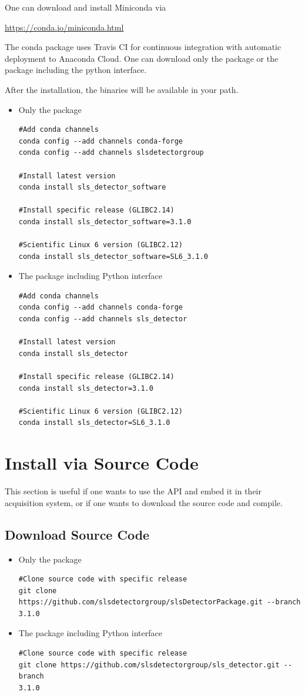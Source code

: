 \documentclass{article}
\begin{document}
\noindent One can download and install Miniconda via 

\url{https://conda.io/miniconda.html} \bigskip

\noindent The conda package uses Travis CI for continuous integration with
automatic deployment to Anaconda Cloud. One can download only the package or the
package including the python interface. \bigskip

\noindent After the installation, the binaries will be available in your path.


\begin{itemize}
 \item Only the package
\begin{verbatim}
#Add conda channels
conda config --add channels conda-forge
conda config --add channels slsdetectorgroup

#Install latest version
conda install sls_detector_software

#Install specific release (GLIBC2.14)
conda install sls_detector_software=3.1.0

#Scientific Linux 6 version (GLIBC2.12)
conda install sls_detector_software=SL6_3.1.0
\end{verbatim}
 \item The package including Python interface
\begin{verbatim}
#Add conda channels
conda config --add channels conda-forge
conda config --add channels sls_detector

#Install latest version
conda install sls_detector

#Install specific release (GLIBC2.14)
conda install sls_detector=3.1.0

#Scientific Linux 6 version (GLIBC2.12)
conda install sls_detector=SL6_3.1.0
\end{verbatim}
\end{itemize}


\clearpage
\section{Install via Source Code}
This section is useful if one wants to use the API and embed it in their
acquisition system, or if one wants to download the source code and compile.

\subsection{Download Source Code}

\begin{itemize}
 \item Only the package
\begin{verbatim}
#Clone source code with specific release
git clone https://github.com/slsdetectorgroup/slsDetectorPackage.git --branch
3.1.0
\end{verbatim}
 \item The package including Python interface
\begin{verbatim}
#Clone source code with specific release
git clone https://github.com/slsdetectorgroup/sls_detector.git --branch
3.1.0
\end{verbatim}
\end{itemize}
\end{document}
